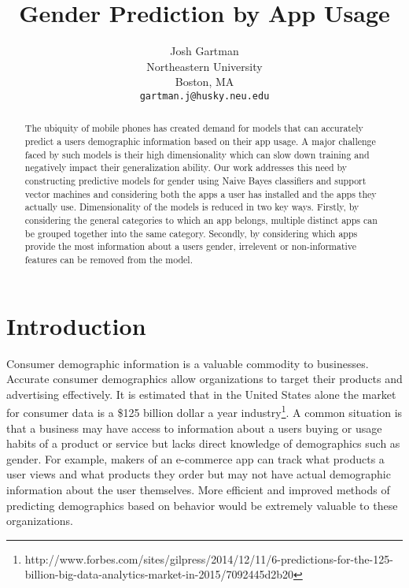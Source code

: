 \documentclass[10pt,twocolumn,letterpaper]{article}
\begin{document}
\title{Gender Prediction by App Usage}

\author{Josh Gartman\\
Northeastern University\\
Boston, MA\\
{\tt\small gartman.j@husky.neu.edu}
}

\maketitle

\begin{abstract}
   The ubiquity of mobile phones has created demand for models that can 
   accurately predict a users demographic information based on their 
   app usage.  A major challenge faced by such models is their high 
   dimensionality which can slow down training and negatively impact their
   generalization ability.  Our work addresses this need by constructing 
   predictive models for gender using Naive Bayes classifiers and support vector machines
   and considering both the apps a user has installed and the apps they actually
   use.  Dimensionality of the models is reduced in two key ways.  Firstly, by considering
   the general categories to which an app belongs, multiple distinct apps can be 
   grouped together into the same category.  Secondly, by considering which apps
   provide the most information about a users gender, irrelevent or non-informative
   features can be removed from the model.
\end{abstract}

\section{Introduction}

Consumer demographic information is a valuable commodity to businesses.  Accurate consumer demographics allow organizations to target their products and advertising effectively.  It is estimated that in the United States alone the market for consumer data is a \$125 billion dollar a year industry\footnote{http://www.forbes.com/sites/gilpress/2014/12/11/6-predictions-for-the-125-billion-big-data-analytics-market-in-2015/7092445d2b20}.  A common situation is that a business may have access to information about a users buying or usage habits of a product or service but lacks direct knowledge of demographics such as gender.  For example, makers of an e-commerce app can track what products a user views and what products they order but may not have actual demographic information about the user themselves.  More efficient and improved methods of predicting demographics based on behavior would be extremely valuable to these organizations.
\end{document}
